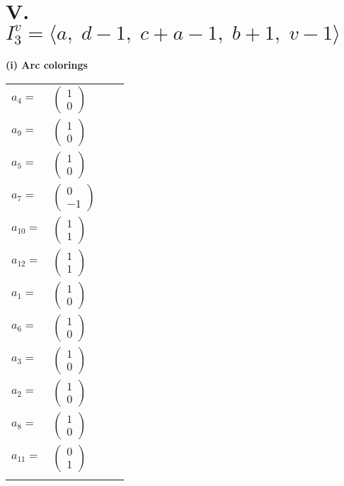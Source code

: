 \documentclass[1p]{elsarticle_modified}
\theoremstyle{definition}
\begin{document}
\centering \section*{V. $I^v_{3}= \langle a,\;d-1,\;c+a-1,\;b+1,\;v-1 \rangle$}
\flushleft \textbf{(i) Arc colorings}\\
\begin{tabular}{m{7pt} m{180pt} m{7pt} m{180pt} }
\flushright $a_{4}=$&$\begin{pmatrix}1\\0\end{pmatrix}$ \\
\flushright $a_{9}=$&$\begin{pmatrix}1\\0\end{pmatrix}$ \\
\flushright $a_{5}=$&$\begin{pmatrix}1\\0\end{pmatrix}$ \\
\flushright $a_{7}=$&$\begin{pmatrix}0\\-1\end{pmatrix}$ \\
\flushright $a_{10}=$&$\begin{pmatrix}1\\1\end{pmatrix}$ \\
\flushright $a_{12}=$&$\begin{pmatrix}1\\1\end{pmatrix}$ \\
\flushright $a_{1}=$&$\begin{pmatrix}1\\0\end{pmatrix}$ \\
\flushright $a_{6}=$&$\begin{pmatrix}1\\0\end{pmatrix}$ \\
\flushright $a_{3}=$&$\begin{pmatrix}1\\0\end{pmatrix}$ \\
\flushright $a_{2}=$&$\begin{pmatrix}1\\0\end{pmatrix}$ \\
\flushright $a_{8}=$&$\begin{pmatrix}1\\0\end{pmatrix}$ \\
\flushright $a_{11}=$&$\begin{pmatrix}0\\1\end{pmatrix}$\\&\end{tabular}
\end{document}
